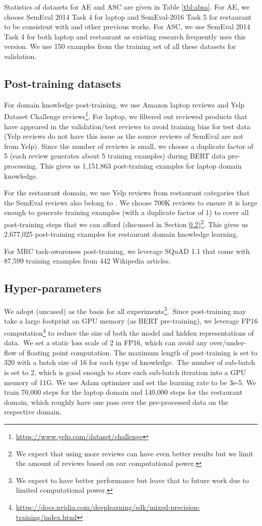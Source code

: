 \documentclass[11pt,a4paper]{article}
\begin{document}
Statistics of datasets for AE and ASC are given in Table \ref{tbl:absa}.
For AE, we choose SemEval 2014 Task 4 for laptop and SemEval-2016 Task 5 for restaurant to be consistent with \cite{xu_acl2018} and other previous works.
For ASC, we use SemEval 2014 Task 4 for both laptop and restaurant as existing research frequently uses this version. We use 150 examples from the training set of all these datasets for validation.

\subsection{Post-training datasets}
For domain knowledge post-training, we use Amazon laptop reviews \cite{HeMcA16a} and Yelp Dataset Challenge reviews\footnote{\url{https://www.yelp.com/dataset/challenge}}.
For laptop, we filtered out reviewed products that have appeared in the validation/test reviews to avoid training bias for test data (Yelp reviews do not have this issue as the source reviews of SemEval are not from Yelp). 
Since the number of reviews is small, we choose a duplicate factor of 5 (each review generates about 5 training examples) during BERT data pre-processing.
This gives us 
1,151,863 post-training examples for laptop domain knowledge.

For the restaurant domain, we use Yelp reviews from restaurant categories that the SemEval reviews also belong to \cite{xu_acl2018}.
We choose 700K reviews to ensure it is large enough to generate training examples (with a duplicate factor of 1) to cover all post-training steps that we can afford (discussed in Section \ref{sec:hyp})\footnote{We expect that using more reviews can have even better results but we limit the amount of reviews based on our computational power.}.
This gives us 2,677,025 post-training examples for restaurant domain knowledge learning.

For MRC task-awareness  post-training, we leverage SQuAD 1.1 \cite{rajpurkar2016squad} that come with 87,599 training examples from 442 Wikipedia articles.

\subsection{Hyper-parameters}
\label{sec:hyp}
We adopt  (uncased) as the basis for all experiments\footnote{We expect  to have better performance but leave that to future work due to limited computational power.}.~Since post-training may take a large footprint on GPU memory (as BERT pre-training), we leverage FP16 computation\footnote{\url{https://docs.nvidia.com/deeplearning/sdk/mixed-precision-training/index.html}} to reduce the size of both the model and hidden representations of data.~We set a static loss scale of 2 in FP16, which can avoid any over/under-flow of floating point computation.
The maximum length of post-training is set to 320 with a batch size of 16 for each type of knowledge.~The number of sub-batch  is set to 2, which is good enough to store each sub-batch iteration into a GPU memory of 11G. We use Adam optimizer and set the learning rate to be 3e-5.
We train 70,000 steps for the laptop domain and 140,000 steps for the restaurant domain, which roughly have one pass over the pre-processed data on the respective domain.
\end{document}
